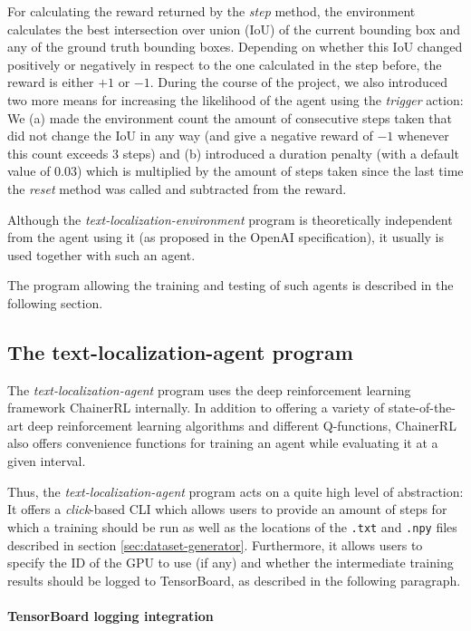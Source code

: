 For calculating the reward returned by the \textit{step} method, the environment calculates the best intersection over union (IoU) of the current bounding box and any of the ground truth bounding boxes. 
Depending on whether this IoU changed positively or negatively in respect to the one calculated in the step before, the reward is either $+1$ or $-1$. 
During the course of the project, we also introduced two more means for increasing the likelihood of the agent using the \textit{trigger} action: We (a) made the environment count the amount of consecutive steps taken that did not change the IoU in any way (and give a negative reward of $-1$ whenever this count exceeds 3 steps) and (b) introduced a duration penalty (with a default value of $0.03$) which is multiplied by the amount of steps taken since the last time the \textit{reset} method was called and subtracted from the reward.

Although the \textit{text-localization-environment} program is theoretically independent from the agent using it (as proposed in the OpenAI specification), it usually is used together with such an agent.

The program allowing the training and testing of such agents is described in the following section.

\subsection{The text-localization-agent program}

The \textit{text-localization-agent} program uses the deep reinforcement learning framework ChainerRL\cite{ChainerRL} internally.
In addition to offering a variety of state-of-the-art deep reinforcement learning algorithms and different Q-functions, ChainerRL also offers convenience functions for training an agent while evaluating it at a given interval.

Thus, the \textit{text-localization-agent} program acts on a quite high level of abstraction:
It offers a \textit{click}-based CLI which allows users to provide an amount of steps for which a training should be run as well as the locations of the \texttt{.txt} and \texttt{.npy} files described in section \ref{sec:dataset-generator}. 
Furthermore, it allows users to specify the ID of the GPU to use (if any) and whether the intermediate training results should be logged to TensorBoard, as described in the following paragraph.

\paragraph{TensorBoard logging integration}

